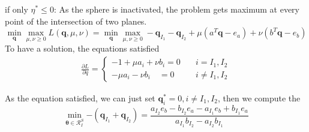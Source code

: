 \documentclass[twoside]{article}
\theoremstyle{plain}
\newcommand{\tranT}{T}
\renewcommand{\vec}[1]{\bm{#1}}
\begin{document}
if only $\eta^{*} \leq 0$:
As the sphere is inactivated, the problem gets maximum at every point of the intersection of two planes.
\begin{equation}
\min_{\vec{q}} \max_{\mu,\nu \geq 0} L(\vec{q},\mu,\nu) =\min_{\vec{q}}\max_{\mu,\nu\geq0} - {\vec{q}_{I_1} - \vec{q}_{I_2} +\mu( a^{\tranT}\vec{q} - e_a ) + \nu( b^{\tranT}\vec{q} - e_b )}
\end{equation}
To have a solution, the equations satisfied
 \begin{equation}
\begin{split} 
\frac{\partial L}{\partial q} = \left\{
\begin{aligned}
-1+\mu a_i + \nu b_i =0 \quad& i = I_1, I_2\\
-\mu a_i -\nu b_i \quad =0& i \neq I_1, I_2
\end{aligned}
\right.
 \end{split}
\end{equation}

As the equation satisfied, we can just set $\vec{q}_i^{*} = 0, i \neq I_1,I_2$, then we compute the  
 \begin{equation}
 \min_{\vec{\theta} \in \mathcal{R}^{S}_{I}}{- ( \vec{q}_{I_1} +\vec{q}_{I_2} )} = \frac{a_{I_2}e_b - b_{I_2}e_a -a_{I_1}e_b +b_{I_1}e_a}{a_{I_1}b_{I_2}-a_{I_2}b_{I_1}}
\end{equation}
\end{document}
